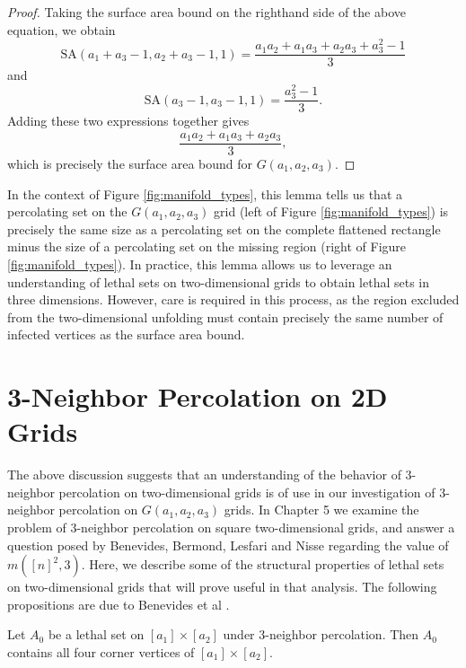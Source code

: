 \begin{proof}
Taking the surface area bound on the righthand side of the above equation, we obtain
$$\text{SA}(a_1+a_3-1, a_2+a_3-1, 1) = \frac{a_1a_2 + a_1a_3 + a_2a_3 + a_3^2 -1}{3}$$
and
$$\text{SA}(a_3-1, a_3-1, 1) = \frac{a_3^2 -1}{3}.$$
Adding these two expressions together gives
$$\frac{a_1a_2 + a_1a_3 + a_2a_3}{3},$$
which is precisely the surface area bound for $G(a_1, a_2, a_3)$. 
\end{proof}

In the context of Figure \ref{fig:manifold_types}, this lemma tells us that a percolating set on the $G(a_1,a_2,a_3)$ grid (left of Figure \ref{fig:manifold_types}) is precisely the same size as a percolating set on the complete flattened rectangle minus the size of a percolating set on the missing region (right of Figure \ref{fig:manifold_types}). In practice, this lemma allows us to leverage an understanding of lethal sets on two-dimensional grids to obtain lethal sets in three dimensions. However, care is required in this process, as the region excluded from the two-dimensional unfolding must contain precisely the same number of infected vertices as the surface area bound.

\section{3-Neighbor Percolation on 2D Grids}

The above discussion suggests that an understanding of the behavior of 3-neighbor percolation on two-dimensional grids is of use in our investigation of 3-neighbor percolation on $G(a_1,a_2,a_3)$ grids. In Chapter 5 we examine the problem of 3-neighbor percolation on square two-dimensional grids, and answer a question posed by Benevides, Bermond, Lesfari and Nisse regarding the value of $m([n]^2, 3)$. Here, we describe some of the structural properties of lethal sets on two-dimensional grids that will prove useful in that analysis. The following propositions are due to Benevides et al \cite{benevides:2021}. 

\begin{prop}
\label{prop:corners}
Let $A_0$ be a lethal set on $[a_1] \times [a_2]$ under 3-neighbor percolation. Then $A_0$ contains all four corner vertices of $[a_1] \times [a_2]$.
\end{prop}

